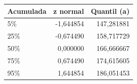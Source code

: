 \begin{tabular}{lrr}
\toprule
Acumulada & z normal & Quantil (a) \\
\midrule
5\% & -1,644854 & 147,281881 \\
25\% & -0,674490 & 158,717729 \\
50\% & 0,000000 & 166,666667 \\
75\% & 0,674490 & 174,615605 \\
95\% & 1,644854 & 186,051453 \\
\bottomrule
\end{tabular}
